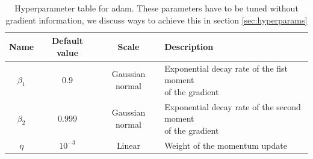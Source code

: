 \begin{table}
\begin{tabular}{cccl}
\toprule
Name &Default value & Scale  & Description\\
\midrule
$\beta_1$  & $0.9$ & Gaussian normal & \makecell[l]{Exponential decay rate of the fist moment \\ of the gradient}\\
$\beta_2$  & $0.999$ & Gaussian normal & \makecell[l]{Exponential decay rate of the second moment \\ of the gradient}\\
$\eta$  & $10^{-3}$ & Linear & Weight of the momentum update \\
\bottomrule
\end{tabular}
\caption{Hyperparameter table for adam. These parameters have to be tuned without gradient information, we discuss ways to achieve this in section \ref{sec:hyperparams}}\label{tab:adam}
\end{table}


